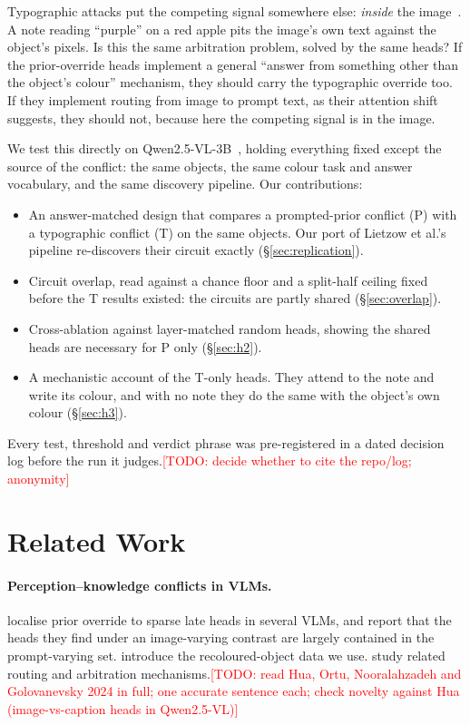 \documentclass[10pt,twocolumn,letterpaper]{article}
\newcommand{\todo}[1]{\textcolor{red}{[TODO: #1]}}
\begin{document}
Typographic attacks put the competing signal somewhere else: \emph{inside} the
image~\cite{goh2021multimodal,westerhoff2025scam}. A note reading ``purple'' on a
red apple pits the image's own text against the object's pixels. Is this the same
arbitration problem, solved by the same heads? If the prior-override heads
implement a general ``answer from something other than the object's colour''
mechanism, they should carry the typographic override too. If they implement
routing from image to prompt text, as their attention shift suggests, they should
not, because here the competing signal is in the image.

We test this directly on Qwen2.5-VL-3B~\cite{bai2025qwen25vl}, holding everything
fixed except the source of the conflict: the same objects, the same colour task
and answer vocabulary, and the same discovery pipeline. Our contributions:
\begin{itemize}\itemsep0pt
\item An answer-matched design that compares a prompted-prior conflict (P) with
a typographic conflict (T) on the same objects. Our port of Lietzow et al.'s
pipeline re-discovers their circuit exactly (\S\ref{sec:replication}).
\item Circuit overlap, read against a chance floor and a split-half ceiling
fixed before the T results existed: the circuits are partly shared
(\S\ref{sec:overlap}).
\item Cross-ablation against layer-matched random heads, showing the shared
heads are necessary for P only (\S\ref{sec:h2}).
\item A mechanistic account of the T-only heads. They attend to the note and
write its colour, and with no note they do the same with the object's own colour
(\S\ref{sec:h3}).
\end{itemize}
Every test, threshold and verdict phrase was pre-registered in a dated decision
log before the run it judges.\todo{decide whether to cite the repo/log; anonymity}

\section{Related Work}

\paragraph{Perception--knowledge conflicts in VLMs.}
\citet{lietzow2026} localise prior override to sparse late heads in several VLMs,
and report that the heads they find under an image-varying contrast are largely
contained in the prompt-varying set. \citet{golovanevsky2025counterfact}
introduce the recoloured-object data we use.
\citet{golovanevsky2024notice,hua2025,ortu2025,nooralahzadeh2026} study related
routing and arbitration mechanisms.\todo{read Hua, Ortu, Nooralahzadeh and
Golovanevsky 2024 in full; one accurate sentence each; check novelty against Hua
(image-vs-caption heads in Qwen2.5-VL)}
\end{document}
